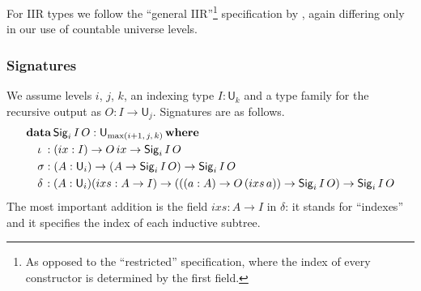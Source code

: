 \documentclass[acmsmall,screen,review]{acmart}
\newcommand{\msf}[1]{{\mathsf{#1}}}
\newcommand{\mbf}[1]{{\mathbf{#1}}}
\newcommand{\data}{\mbf{data}}
\newcommand{\U}{\msf{U}}
\newcommand{\where}{\mbf{where}}
\newcommand{\Sig}{\msf{Sig}}
\newcommand{\ix}{{ix}}
\newcommand{\ixs}{{ixs}}
\begin{document}
For IIR types we follow the ``general IIR''\footnote{As opposed to the ``restricted'' specification,
where the index of every constructor is determined by the first field.} specification by
\citet{DBLP:journals/jlp/DybjerS06}, again differing only in our use of countable universe levels.

\subsubsection{Signatures}\label{sec:iir-signatures} We assume levels $i$, $j$, $k$, an indexing type $I : \U_k$ and a type family
for the recursive output as $O : I \to \U_j$. Signatures are as follows.
\begin{alignat*}{4}
  &\data\, \Sig_i\,I\,O : \U_{\max(i+1,\,j,\,k)}\,\where\\
  &\quad \iota\hspace{0.25em}  : (\ix : I) \to O\,\ix \to \Sig_i\,I\,O \\
  &\quad \sigma                : (A : \U_i) \to (A \to \Sig_i\,I\,O) \to \Sig_i\,I\,O \\
  &\quad \delta\hspace{0.1em}  : (A : \U_i)(\ixs : A \to I) \to (((a : A) \to O\,(\ixs\,a)) \to \Sig_i\,I\,O) \to \Sig_i\,I\,O
\end{alignat*}
The most important addition is the field $\ixs : A \to I$ in $\delta$: it stands for ``indexes'' and
it specifies the index of each inductive subtree.
\end{document}
